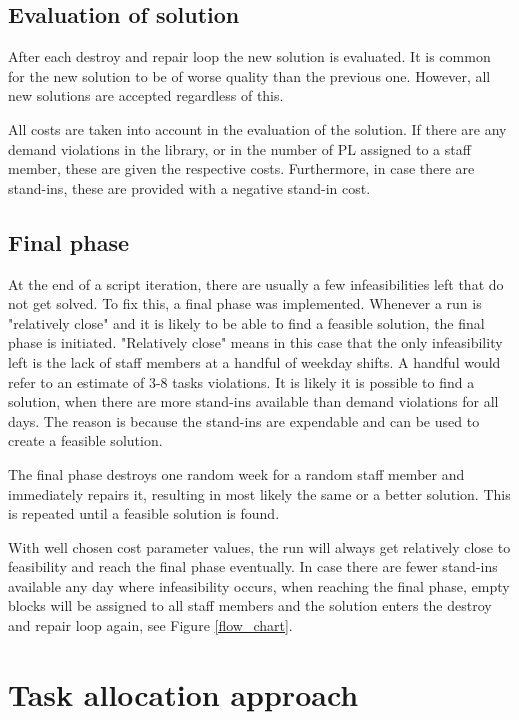 \subsection{Evaluation of solution}
After each destroy and repair loop the new solution is evaluated. It is common for the new solution to be of worse quality than the previous one. However, all new solutions are accepted regardless of this.

All costs are taken into account in the evaluation of the solution. If there are any demand violations in the library, or in the number of PL assigned to a staff member, these are given the respective costs. Furthermore, in case there are stand-ins, these are provided with a negative stand-in cost. 
\subsection{Final phase}
At the end of a script iteration, there are usually a few infeasibilities left that do not get solved. To fix this, a final phase was implemented. Whenever a run is "relatively close" and it is likely to be able to find a feasible solution, the final phase is initiated. "Relatively close" means in this case that the only infeasibility left is the lack of staff members at a handful of weekday shifts. A handful would refer to an estimate of 3-8 tasks violations. It is likely it is possible to find a solution, when there are more stand-ins available than demand violations for all days. The reason is because the stand-ins are expendable and can be used to create a feasible solution.

The final phase destroys one random week for a random staff member and immediately repairs it, resulting in most likely the same or a better solution. This is repeated until a feasible solution is found. %

With well chosen cost parameter values, the run will always get relatively close to feasibility and reach the final phase eventually. In case there are fewer stand-ins available any day where infeasibility occurs, when reaching the final phase, empty blocks will be assigned to all staff members and the solution enters the destroy and repair loop again, see Figure \ref{flow_chart}.

\section{Task allocation approach} \label{section:impl_task_dist}

